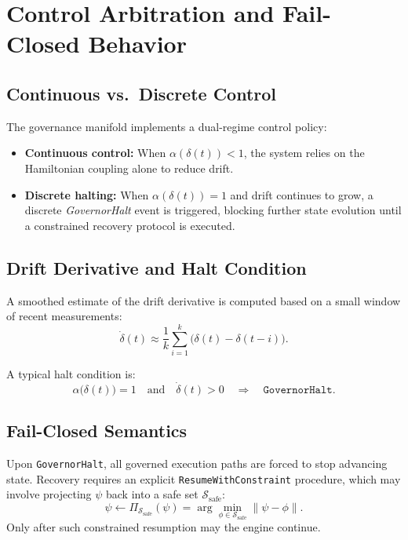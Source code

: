 \documentclass[11pt]{article}
\begin{document}
\section{Control Arbitration and Fail-Closed Behavior}

\subsection{Continuous vs.\ Discrete Control}

The governance manifold implements a dual-regime control policy:

\begin{itemize}[noitemsep]
  \item \textbf{Continuous control:} When $\alpha(\delta(t)) < 1$, the system relies on the Hamiltonian coupling alone to reduce drift.
  \item \textbf{Discrete halting:} When $\alpha(\delta(t)) = 1$ and drift continues to grow, a discrete \emph{GovernorHalt} event is triggered, blocking further state evolution until a constrained recovery protocol is executed.
\end{itemize}

\subsection{Drift Derivative and Halt Condition}

A smoothed estimate of the drift derivative is computed based on a small window of recent measurements:
\begin{equation}
  \dot{\delta}(t) \approx \frac{1}{k}\sum_{i=1}^{k}\big(\delta(t) - \delta(t-i)\big).
\end{equation}

A typical halt condition is:
\begin{equation}
  \alpha\big(\delta(t)\big) = 1
  \quad\text{and}\quad
  \dot{\delta}(t) > 0
  \quad\Rightarrow\quad
  \texttt{GovernorHalt}.
\end{equation}

\subsection{Fail-Closed Semantics}

Upon \texttt{GovernorHalt}, all governed execution paths are forced to stop advancing state.
Recovery requires an explicit \texttt{ResumeWithConstraint} procedure, which may involve projecting $\psi$ back into a safe set $\mathcal{S}_{\mathrm{safe}}$:
\begin{equation}
  \psi \leftarrow \Pi_{\mathcal{S}_{\mathrm{safe}}}(\psi)
  = \arg\min_{\phi \in \mathcal{S}_{\mathrm{safe}}} \|\psi - \phi\|.
\end{equation}
Only after such constrained resumption may the engine continue.
\end{document}

